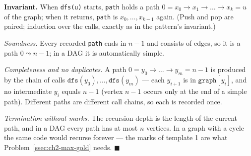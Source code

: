 \begin{invariantbox}
\textbf{Invariant.} When \texttt{dfs(u)} starts, \texttt{path} holds a path $0 = x_0 \to x_1 \to \dots \to x_k = u$ of the graph; when it returns, \texttt{path} is $x_0, \dots, x_{k-1}$ again. (Push and pop are paired; induction over the calls, exactly as in the pattern's invariant.)

\emph{Soundness.} Every recorded \texttt{path} ends in $n-1$ and consists of edges, so it is a path $0 \leadsto n-1$; in a DAG it is automatically simple.

\emph{Completeness and no duplicates.} A path $0 = y_0 \to \dots \to y_m = n-1$ is produced by the chain of calls $\texttt{dfs}(y_0), \dots, \texttt{dfs}(y_m)$ --- each $y_{i+1}$ is in $\texttt{graph}[y_i]$, and no intermediate $y_i$ equals $n-1$ (vertex $n-1$ occurs only at the end of a simple path). Different paths are different call chains, so each is recorded once.

\emph{Termination without marks.} The recursion depth is the length of the current path, and in a DAG every path has at most $n$ vertices. In a graph with a cycle the same code would recurse forever --- the marks of template 1 are what Problem~\ref{ssec:ch2-max-gold} needs. \hfill$\blacksquare$
\end{invariantbox}

